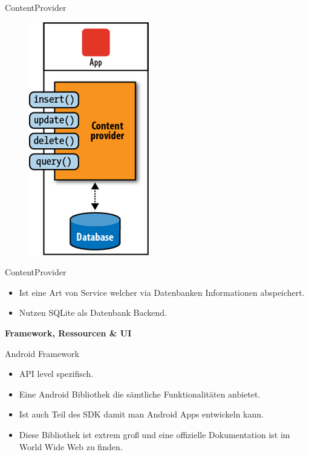 \documentclass{beamer}
\begin{document}
\begin{frame}{ContentProvider}
\begin{figure}[hb]
 \centering
 \includegraphics[scale=0.4]{android-cp}
\end{figure}
\end{frame}

\begin{frame}{ContentProvider}
\begin{itemize}
\item Ist eine Art von Service welcher via Datenbanken Informationen abspeichert.
\item Nutzen SQLite als Datenbank Backend.
\end{itemize}
\end{frame}

\begin{frame}
\begin{center}
\huge\textbf{Framework, Ressourcen \& UI}
\end{center}
\end{frame}

\begin{frame}{Android Framework}
\begin{itemize}
\item API level spezifisch.
\item Eine Android Bibliothek die sämtliche Funktionalitäten anbietet.
\item Ist auch Teil des SDK damit man Android Apps entwickeln kann.
\item Diese Bibliothek ist extrem groß und eine offizielle Dokumentation ist im World Wide Web zu finden.
\end{itemize}
\end{frame}
\end{document}
